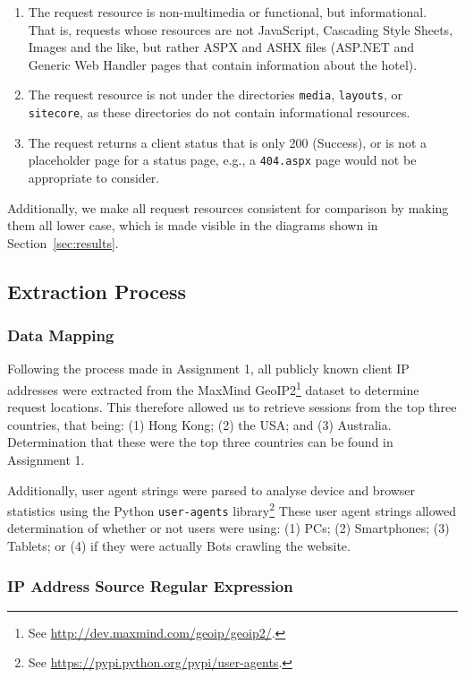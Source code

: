\begin{enumerate}
  \item The request resource is non-multimedia or functional, but informational. That is, requests whose resources are not JavaScript, Cascading Style Sheets, Images and the like, but rather ASPX and ASHX files (ASP.NET and Generic Web Handler pages that contain information about the hotel).
  \item The request resource is not under the directories \texttt{media}, \texttt{layouts}, or \texttt{sitecore}, as these directories do not contain informational resources.
  \item The request returns a client status that is only 200 (Success), or is not a placeholder page for a status page, e.g., a \texttt{404.aspx} page would not be appropriate to consider.
\end{enumerate}

Additionally, we make all request resources consistent for comparison by making them all lower case, which is made visible in the diagrams shown in Section~\ref{sec:results}.

\subsection{Extraction Process}
\label{sec:method:extraction_process}

\subsubsection{Data Mapping}
\label{sec:method:extraction_process:data_mapping}

Following the process made in Assignment 1, all publicly known client IP addresses were extracted from the MaxMind GeoIP2\footnote{See \url{http://dev.maxmind.com/geoip/geoip2/}.} dataset to determine request locations. This therefore allowed us to retrieve sessions from the top three countries, that being: (1) Hong Kong; (2) the USA; and (3) Australia. Determination that these were the top three countries can be found in Assignment 1.

Additionally, user agent strings were parsed to analyse device and browser statistics using the Python \texttt{user-agents} library\footnote{See \url{https://pypi.python.org/pypi/user-agents}.} These user agent strings allowed determination of whether or not users were using: (1) PCs; (2) Smartphones; (3) Tablets; or (4) if they were actually Bots crawling the website.

\subsubsection{IP Address Source Regular Expression}
\label{sec:method:extraction_process:ip_regex}

